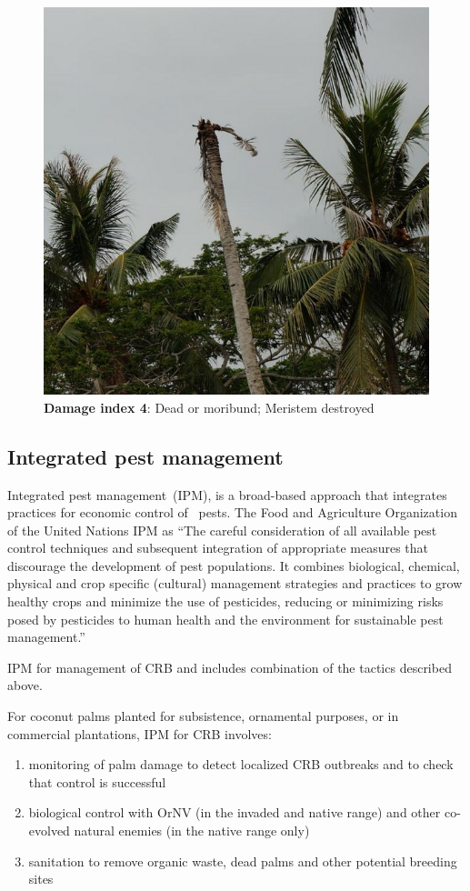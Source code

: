 \documentclass[twocolumn,letterpaper]{scrartcl}
\begin{document}
\begin{figure}[p]
	\centering
	\includegraphics[width=.8\linewidth]{images/j5index4.resized.png}
	\caption{\textbf{Damage index 4}: Dead or moribund; Meristem destroyed}
	\label{fig:damage4}
\end{figure}

\newpage
\subsection{Integrated pest management}

Integrated pest management (IPM), is a broad-based approach that integrates practices for economic control of  pests.  The  Food and Agriculture Organization of the United Nations   IPM  as  “The careful consideration of all available pest control techniques and subsequent integration of appropriate measures that discourage the development of pest populations. It combines biological, chemical, physical and crop specific (cultural) management strategies and practices to grow healthy crops and minimize the use of pesticides, reducing or minimizing risks posed by pesticides to human health and the environment for sustainable pest management.”

IPM for management of CRB and includes combination of the tactics described above. 

For coconut palms planted for subsistence, ornamental purposes, or in commercial plantations, IPM for CRB involves: 
\begin{enumerate}
	\item monitoring of palm damage to detect localized CRB outbreaks and to check that control is successful
	\item biological control with OrNV (in the invaded and native range) and other co-evolved natural enemies (in the native range only)
	\item sanitation to remove organic waste, dead palms and  other  potential  breeding  sites
\end{enumerate}
\end{document}
